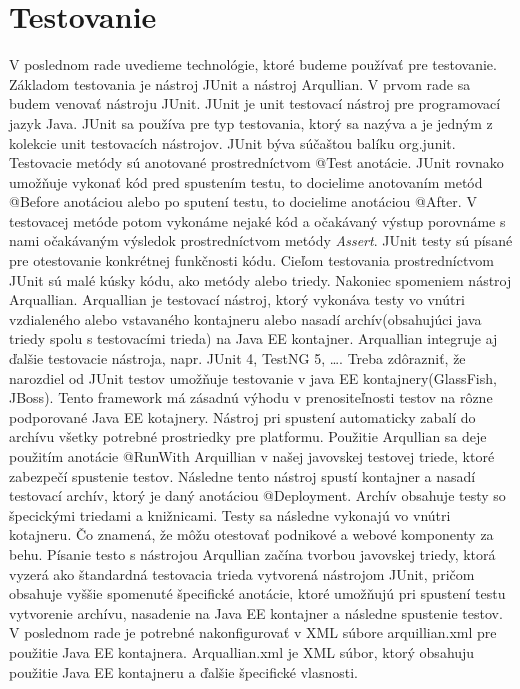 \section{Testovanie}\label{testkap}
V poslednom rade uvedieme technológie, ktoré budeme používať pre testovanie. Základom testovania je nástroj JUnit a nástroj Arqullian.
V prvom rade sa budem venovať nástroju JUnit. JUnit je unit testovací nástroj pre programovací jazyk Java. JUnit sa používa pre typ testovania, ktorý sa nazýva \cite{testdevbook} a je jedným z kolekcie unit testovacích nástrojov. JUnit býva súčaštou balíku org.junit\cite{junitbook}. Testovacie metódy sú anotované prostredníctvom @Test anotácie. JUnit rovnako umožňuje vykonať kód pred spustením testu, to docielime anotovaním metód @Before anotáciou alebo po sputení testu, to docielime anotáciou @After. V testovacej metóde potom vykonáme nejaké kód a očakávaný výstup porovnáme s nami očakávaným výsledok prostredníctvom metódy \emph{Assert}. JUnit testy sú písané pre otestovanie konkrétnej funkčnosti kódu. Cieľom testovania prostredníctvom JUnit sú malé kúsky kódu, ako metódy alebo triedy. 
\newline \indent Nakoniec spomeniem nástroj Arquallian. Arquallian je testovací nástroj, ktorý vykonáva testy vo vnútri vzdialeného alebo vstavaného kontajneru alebo nasadí archív(obsahujúci java triedy spolu s testovacími trieda) na Java EE kontajner. Arquallian integruje aj ďalšie testovacie nástroja, napr. JUnit 4, TestNG 5, \ldots. Treba zdôrazniť, že narozdiel od JUnit testov umožňuje testovanie v java EE kontajnery(GlassFish, JBoss)\cite{arqbook}. Tento framework má zásadnú výhodu v prenositeľnosti testov na rôzne podporované Java EE kotajnery. Nástroj pri spustení automaticky zabalí do archívu všetky potrebné prostriedky pre platformu. 
\newline \indent Použitie Arqullian sa deje použitím anotácie @RunWith Arquillian v našej javovskej testovej triede, ktoré zabezpečí spustenie testov. Následne tento nástroj spustí kontajner a nasadí testovací archív, ktorý je daný anotáciou @Deployment. Archív obsahuje testy so špecickými triedami a knižnicami. Testy sa následne vykonajú vo vnútri kotajneru. Čo znamená, že môžu otestovať podnikové a webové komponenty za behu. Písanie testo s nástrojou Arqullian začína tvorbou javovskej triedy, ktorá vyzerá ako štandardná testovacia trieda vytvorená nástrojom JUnit, pričom obsahuje vyššie spomenuté špecifické anotácie, ktoré umožňujú pri spustení testu vytvorenie archívu, nasadenie na Java EE kontajner a následne spustenie testov. V poslednom rade je potrebné nakonfigurovať v XML súbore arquillian.xml pre použitie Java EE kontajnera. Arquallian.xml je XML súbor, ktorý obsahuju použitie Java EE kontajneru a ďalšie špecifické vlasnosti.



